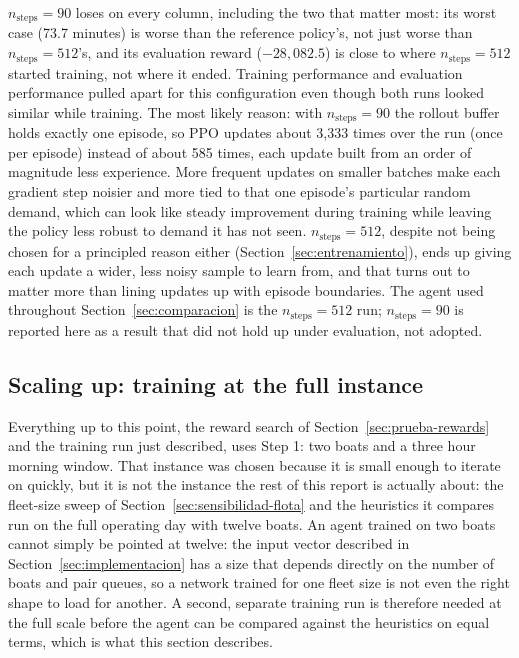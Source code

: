 \documentclass[11pt,a4paper]{article}
\begin{document}
$n_{\text{steps}}=90$ loses on every column, including the two that matter most: its worst case (73.7 minutes) is worse than the reference policy's, not just worse than $n_{\text{steps}}=512$'s, and its evaluation reward ($-28{,}082.5$) is close to where $n_{\text{steps}}=512$ started training, not where it ended. Training performance and evaluation performance pulled apart for this configuration even though both runs looked similar while training. The most likely reason: with $n_{\text{steps}}=90$ the rollout buffer holds exactly one episode, so PPO updates about 3{,}333 times over the run (once per episode) instead of about 585 times, each update built from an order of magnitude less experience. More frequent updates on smaller batches make each gradient step noisier and more tied to that one episode's particular random demand, which can look like steady improvement during training while leaving the policy less robust to demand it has not seen. $n_{\text{steps}}=512$, despite not being chosen for a principled reason either (Section~\ref{sec:entrenamiento}), ends up giving each update a wider, less noisy sample to learn from, and that turns out to matter more than lining updates up with episode boundaries. The agent used throughout Section~\ref{sec:comparacion} is the $n_{\text{steps}}=512$ run; $n_{\text{steps}}=90$ is reported here as a result that did not hold up under evaluation, not adopted.

\subsection{Scaling up: training at the full instance}
\label{sec:entrenamiento-completo}

Everything up to this point, the reward search of Section~\ref{sec:prueba-rewards} and the training run just described, uses Step 1: two boats and a three hour morning window. That instance was chosen because it is small enough to iterate on quickly, but it is not the instance the rest of this report is actually about: the fleet-size sweep of Section~\ref{sec:sensibilidad-flota} and the heuristics it compares run on the full operating day with twelve boats. An agent trained on two boats cannot simply be pointed at twelve: the input vector described in Section~\ref{sec:implementacion} has a size that depends directly on the number of boats and pair queues, so a network trained for one fleet size is not even the right shape to load for another. A second, separate training run is therefore needed at the full scale before the agent can be compared against the heuristics on equal terms, which is what this section describes.
\end{document}
